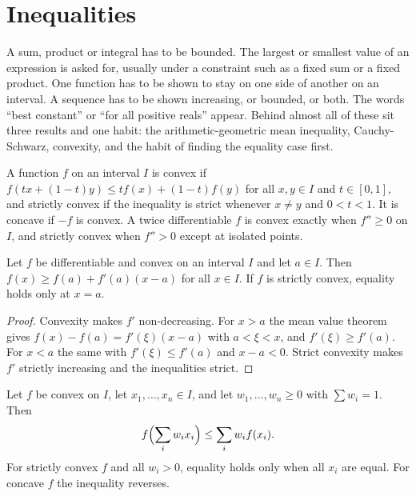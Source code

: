 \section{Inequalities}

\begin{recognise}
A sum, product or integral has to be bounded. The largest or smallest value of an expression is asked for, usually under a constraint such as a fixed sum or a fixed product. One function has to be shown to stay on one side of another on an interval. A sequence has to be shown increasing, or bounded, or both. The words ``best constant'' or ``for all positive reals'' appear. Behind almost all of these sit three results and one habit: the arithmetic-geometric mean inequality, Cauchy-Schwarz, convexity, and the habit of finding the equality case first.
\end{recognise}

\begin{definition}
A function $f$ on an interval $I$ is convex if $f(tx+(1-t)y)\le tf(x)+(1-t)f(y)$ for all $x,y\in I$ and $t\in[0,1]$, and strictly convex if the inequality is strict whenever $x\ne y$ and $0<t<1$. It is concave if $-f$ is convex. A twice differentiable $f$ is convex exactly when $f''\ge 0$ on $I$, and strictly convex when $f''>0$ except at isolated points.
\end{definition}

\begin{lemma}
Let $f$ be differentiable and convex on an interval $I$ and let $a\in I$. Then $f(x)\ge f(a)+f'(a)(x-a)$ for all $x\in I$. If $f$ is strictly convex, equality holds only at $x=a$.
\end{lemma}

\begin{proof}
Convexity makes $f'$ non-decreasing. For $x>a$ the mean value theorem gives $f(x)-f(a)=f'(\xi)(x-a)$ with $a<\xi<x$, and $f'(\xi)\ge f'(a)$. For $x<a$ the same with $f'(\xi)\le f'(a)$ and $x-a<0$. Strict convexity makes $f'$ strictly increasing and the inequalities strict.
\end{proof}

\begin{theorem}[Jensen]
Let $f$ be convex on $I$, let $x_1,\dots,x_n\in I$, and let $w_1,\dots,w_n\ge 0$ with $\sum w_i=1$. Then
\[
f\Bigl(\sum_i w_ix_i\Bigr)\le\sum_i w_if(x_i).
\]
For strictly convex $f$ and all $w_i>0$, equality holds only when all $x_i$ are equal. For concave $f$ the inequality reverses.
\end{theorem}

